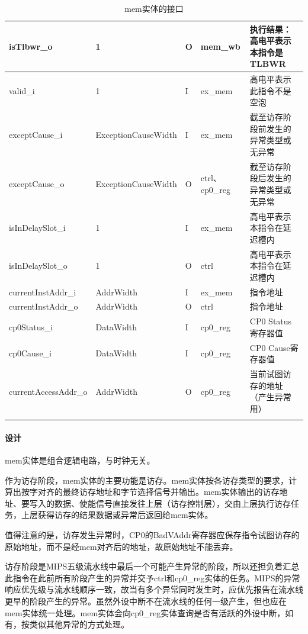 \documentclass{article}
\begin{document}
\begin{spacing}{1.4}
\begin{longtable}{l|l|l|l|p{5cm}}
\hline isTlbwr\_o              & 1                      & O     & mem\_wb       & 执行结果：高电平表示本指令是TLBWR \\
\hline valid\_i                & 1                      & I     & ex\_mem       & 高电平表示此指令不是空泡 \\
\hline exceptCause\_i          & ExceptionCauseWidth    & I     & ex\_mem       & 截至访存阶段前发生的异常类型或无异常 \\
\hline exceptCause\_o          & ExceptionCauseWidth    & O     & ctrl、cp0\_reg& 截至访存阶段后发生的异常类型或无异常 \\
\hline isInDelaySlot\_i        & 1                      & I     & ex\_mem       & 高电平表示本指令在延迟槽内 \\
\hline isInDelaySlot\_o        & 1                      & O     & ctrl          & 高电平表示本指令在延迟槽内 \\
\hline currentInstAddr\_i      & AddrWidth              & I     & ex\_mem       & 指令地址 \\
\hline currentInstAddr\_o      & AddrWidth              & O     & ctrl          & 指令地址 \\
\hline cp0Status\_i            & DataWidth              & I     & cp0\_reg      & CP0 Status寄存器值 \\
\hline cp0Cause\_i             & DataWidth              & I     & cp0\_reg      & CP0 Cause寄存器值 \\
\hline currentAccessAddr\_o    & AddrWidth              & O     & cp0\_reg      & 当前试图访存的地址（产生异常用）\\
\hline
\caption{mem实体的接口}
\label{tb:mem-interface}
\end{longtable}

\paragraph{设计}\mbox{}

mem实体是组合逻辑电路，与时钟无关。

作为访存阶段，mem实体的主要功能是访存。mem实体按各访存类型的要求，计算出按字对齐的最终访存地址和字节选择信号并输出。mem实体输出的访存地址、要写入的数据、使能信号直接发往上层（访存控制层），交由上层执行访存任务，上层获得访存的结果数据或异常后返回给mem实体。

值得注意的是，访存发生异常时，CP0的BadVAddr寄存器应保存指令试图访存的原始地址，而不是经mem对齐后的地址，故原始地址不能丢弃。

访存阶段是MIPS五级流水线中最后一个可能产生异常的阶段，所以还担负着汇总此指令在此前所有阶段产生的异常并交予ctrl和cp0\_reg实体的任务。MIPS的异常响应优先级与流水线顺序一致，故当有多个异常同时发生时，应优先报告在流水线更早的阶段产生的异常。虽然外设中断不在流水线的任何一级产生，但也应在mem实体统一处理。mem实体会向cp0\_reg实体查询是否有活跃的外设中断，如有，按类似其他异常的方式处理。


\end{spacing}
\end{document}
